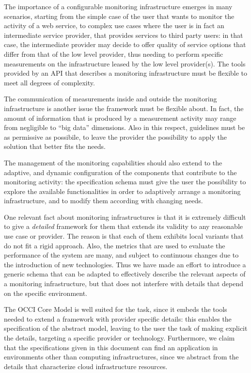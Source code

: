 \documentclass[10pt]{article}  %
\begin{document}
The importance of a configurable monitoring infrastructure emerges in many scenarios, starting from the simple case of the user that wants to monitor the activity of a web service, to complex use cases where the user is in fact an intermediate service provider, that provides services to third party users: in that case, the intermediate provider may decide to offer quality of service options that differ from that of the low level provider, thus needing to perform specific measurements on the infrastructure leased by the low level provider(s). The tools provided by an API that describes a monitoring infrastructure must be flexible to meet all degrees of complexity.

The communication of measurements inside and outside the monitoring infrastructure is another issue the framework must be flexible about. In fact, the amount of information that is produced by a measurement activity may range from negligible to ``big data'' dimensions. Also in this respect, guidelines must be as permissive as possibile, to leave the provider the possibility to apply the solution that better fits the needs.

The management of the monitoring capabilities should also extend to the adaptive, and dynamic configuration of the components that contribute to the monitoring activity: the specification schema must give the user the possibility to explore the available functionalities in order to adaptively arrange a monitoring infrastructure, and to modify them according with changing needs.

One relevant fact about monitoring infrastructures is that it is extremely difficult to give a {\em detailed} framework for them that extends its validity to any reasonable use case or provider. The reason is that each of them exhibits local variants that do not fit a rigid approach. Also, the metrics that are used to evaluate the performance of the system are many, and subject to continuous changes due to the introduction of new technologies. Thus we have made an effort to introduce a generic schema that can be adapted to effectively describe the relevant aspects of a monitoring infrastructure, but that does not interfere with details that depend on the specific environment.

The OCCI Core Model \cite{occi:core} is well suited for the task, since it embeds the tools needed to extend a framework with provider specific details: this enables the specification of the abstract model, leaving to the user the task of making explicit the details, targeting a specific provider or technology. Furthermore, we claim that the specifications given in this document can find an application in environments other than computing infrastructures, since we abstract from the details that characterize cloud infrastructure resources.
\end{document}
